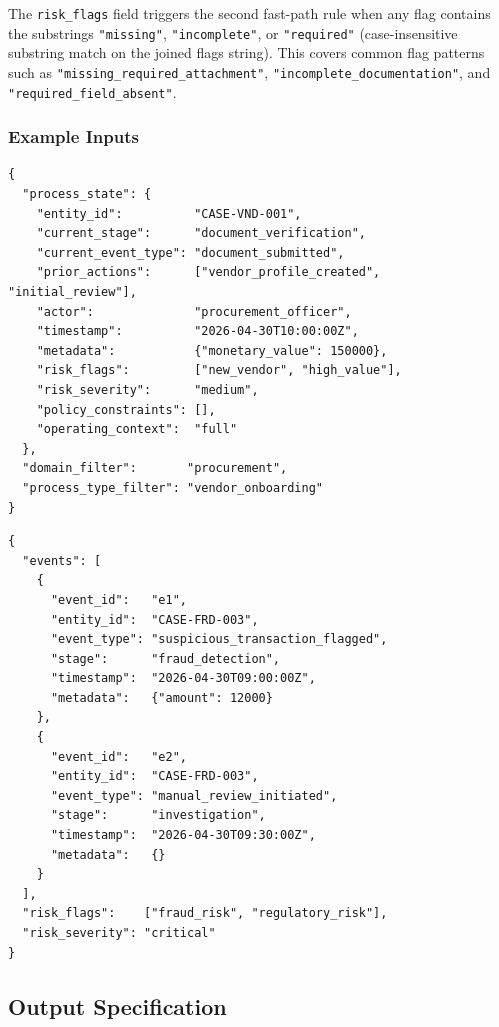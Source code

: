 \documentclass[12pt,a4paper]{article}
\begin{document}
The \texttt{risk\_flags} field triggers the second fast-path rule when any flag
contains the substrings \texttt{"missing"}, \texttt{"incomplete"}, or
\texttt{"required"} (case-insensitive substring match on the joined flags string).
This covers common flag patterns such as \texttt{"missing\_required\_attachment"},
\texttt{"incomplete\_documentation"}, and \texttt{"required\_field\_absent"}.

\subsubsection{Example Inputs}

\begin{lstlisting}[caption={Standard path input: medium-risk vendor onboarding}]
{
  "process_state": {
    "entity_id":          "CASE-VND-001",
    "current_stage":      "document_verification",
    "current_event_type": "document_submitted",
    "prior_actions":      ["vendor_profile_created", "initial_review"],
    "actor":              "procurement_officer",
    "timestamp":          "2026-04-30T10:00:00Z",
    "metadata":           {"monetary_value": 150000},
    "risk_flags":         ["new_vendor", "high_value"],
    "risk_severity":      "medium",
    "policy_constraints": [],
    "operating_context":  "full"
  },
  "domain_filter":       "procurement",
  "process_type_filter": "vendor_onboarding"
}
\end{lstlisting}

\begin{lstlisting}[caption={Fast-path input: critical-risk fraud investigation}]
{
  "events": [
    {
      "event_id":   "e1",
      "entity_id":  "CASE-FRD-003",
      "event_type": "suspicious_transaction_flagged",
      "stage":      "fraud_detection",
      "timestamp":  "2026-04-30T09:00:00Z",
      "metadata":   {"amount": 12000}
    },
    {
      "event_id":   "e2",
      "entity_id":  "CASE-FRD-003",
      "event_type": "manual_review_initiated",
      "stage":      "investigation",
      "timestamp":  "2026-04-30T09:30:00Z",
      "metadata":   {}
    }
  ],
  "risk_flags":    ["fraud_risk", "regulatory_risk"],
  "risk_severity": "critical"
}
\end{lstlisting}

\subsection{Output Specification}
\end{document}
